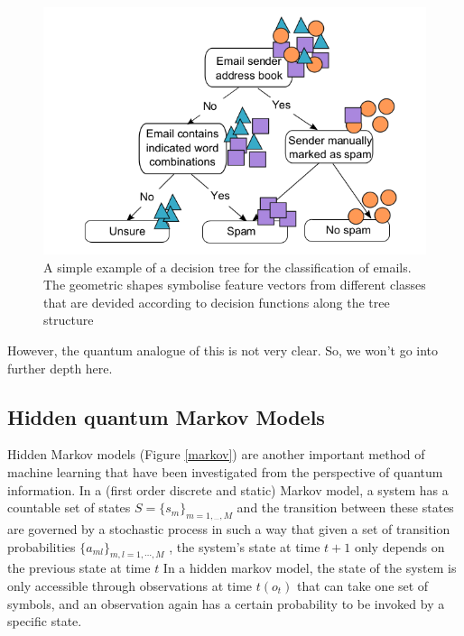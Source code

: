 \documentclass[conference]{IEEEtran}
\begin{document}
\begin{figure}[htbp]
\centerline{\includegraphics[scale = 0.3]{Images/dec-tree.png}}
\caption{A simple example of a decision tree for
the classification of emails. The geometric shapes
symbolise feature vectors from different classes that
are devided according to decision functions along the
tree structure}
\label{tree}
\end{figure}
However, the quantum analogue of this is not very clear. So, we won't go into further depth here.

\subsection{Hidden quantum Markov Models}
Hidden Markov models (Figure \ref{markov}) are another important method of machine learning that have been investigated from the perspective of quantum information.
In a (first order discrete and static) Markov model, a system has a countable set of states
$S = \{s_m\}_{m=1,{}_{\cdots},M}$ and the transition between these states are governed by a stochastic process in such
a way that given a set of transition probabilities $\{a_{ml}\}_{m,l=1,\cdots,M}$ , the system's state at time $t + 1$ only depends on the previous state at time $t$
In a hidden markov model, the state of the system is only accessible through observations at time $t(o_t)$ that can take one set of symbols, and an observation again has a
certain probability to be invoked by a specific state.
\end{document}
